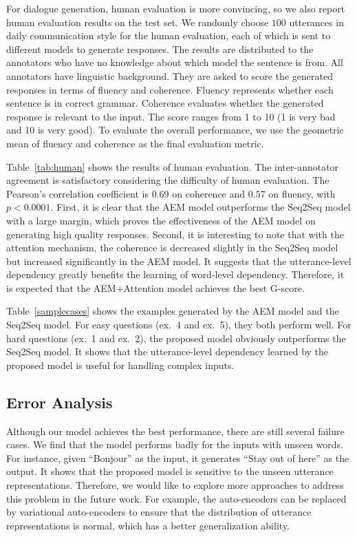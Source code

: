 \documentclass[11pt,a4paper]{article}
\begin{document}
\begin{CJK}{UTF8}{song}
For dialogue generation, human evaluation is more convincing, so we also report human evaluation results on the test set. We randomly choose $100$ utterances in daily communication style for the human evaluation, each of which is sent to different models to generate responses. The results are distributed to the annotators who have no knowledge about which model the sentence is from. All annotators have linguistic background. They are asked to score the generated responses in terms of fluency and coherence. Fluency represents whether each sentence is in correct grammar. Coherence evaluates whether the generated response is relevant to the input. The score ranges from 1 to 10 (1 is very bad and 10 is very good). To evaluate the overall performance, we use the geometric mean of fluency and coherence as the final evaluation metric. 

Table~\ref{tab:human} shows the results of human evaluation. The inter-annotator agreement is satisfactory considering the difficulty of human evaluation. The Pearson's correlation coefficient is $0.69$ on coherence and $0.57$ on fluency, with $p<0.0001$. First, it is clear that the AEM model outperforms the Seq2Seq model with a large margin, which proves the effectiveness of the AEM model on generating high quality responses. Second, it is interesting to note that with the attention mechanism, the coherence is decreased slightly in the Seq2Seq model but increased significantly in the AEM model. It suggests that the utterance-level dependency greatly benefits the learning of word-level dependency. Therefore, it is expected that the AEM+Attention model achieves the best G-score.  








Table~\ref{samplecases} shows the examples generated by the AEM model and the Seq2Seq model. For easy questions (ex.~4 and ex.~5), they both perform well. For hard questions (ex.~1 and ex.~2), the proposed model obviously outperforms the Seq2Seq model. It shows that the utterance-level dependency learned by the proposed model is useful for handling complex inputs.

\subsection{Error Analysis}
Although our model achieves the best performance, there are still several failure cases. We find that the model performs badly for the inputs with unseen words. For instance, given ``Bonjour'' as the input, it generates ``Stay out of here'' as the output. It shows that the proposed model is sensitive to the unseen utterance representations. Therefore, we would like to explore more approaches to address this problem in the future work. For example, the auto-encoders can be replaced by variational auto-encoders to ensure that the distribution of utterance representations is normal, which has a better generalization ability.   


\end{CJK}
\end{document}
